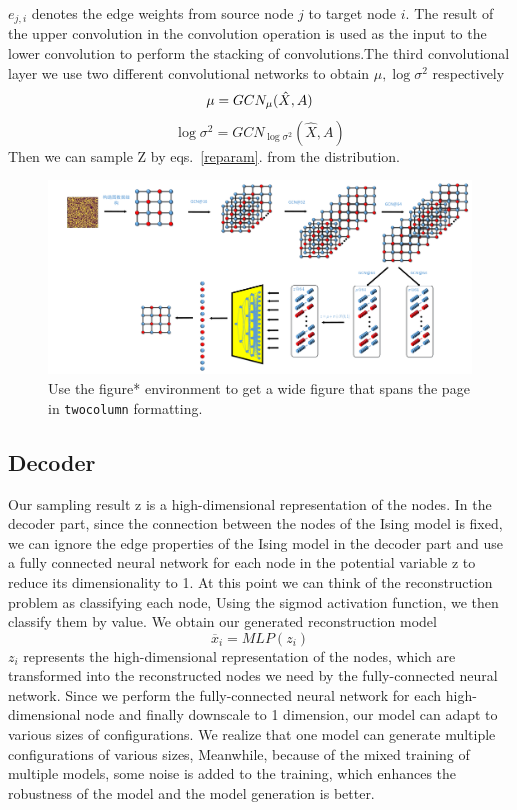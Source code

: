 \documentclass[%
reprint,
amsmath,amssymb,
aps,
]{revtex4-2}
\begin{document}
	$e_{j,i}$ denotes the edge weights from source node $j$ to target node $i$.
	The result of the upper convolution in the convolution operation is used as the input to the lower convolution to perform the stacking of convolutions.The third convolutional layer we use two different convolutional networks to obtain $\mu,\log{\sigma^2}$ respectively
	\begin{equation}\label{mu}
		\mu = GCN_{\mu}(\hat X,A) \\
	\end{equation}	
	\begin{equation}\label{log}
		\log{\sigma^2} = GCN_{\log{\sigma^2}}(\hat X,A)
	\end{equation}
	Then we can sample Z by eqs.~\ref{reparam}. from the distribution.
	\begin{figure}
		\includegraphics[scale=0.2]{spin_vgae2}
		\caption{\label{fig:wide}Use the figure* environment to get a wide figure that spans the page in \texttt{twocolumn} formatting.}
		\label{fig:spinvgae2}
	\end{figure}
	\subsection{Decoder}
	Our sampling result z is a high-dimensional representation of the nodes. In the decoder part, since the connection between the nodes of the Ising model is fixed, we can ignore the edge properties of the Ising model in the decoder part and use a fully connected neural network for each node in the potential variable z to reduce its dimensionality to 1. At this point we can think of the reconstruction problem as classifying each node, Using the sigmod activation function, we then classify them by value. We obtain our generated reconstruction model
	\begin{equation}\label{x_i}
		\overline x_i = MLP(z_i)
	\end{equation}
	$z_i$ represents the high-dimensional representation of the nodes, which are transformed into the reconstructed nodes we need by the fully-connected neural network. Since we perform the fully-connected neural network for each high-dimensional node and finally downscale to 1 dimension, our model can adapt to various sizes of configurations. We realize that one model can generate multiple configurations of various sizes, Meanwhile, because of the mixed training of multiple models, some noise is added to the training, which enhances the robustness of the model and the model generation is better.
	
\end{document}
